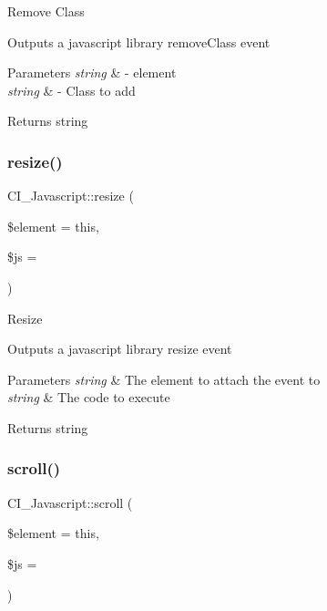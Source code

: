 Remove Class

Outputs a javascript library remove\+Class event


\begin{DoxyParams}{Parameters}
{\em string} & -\/ element \\
\hline
{\em string} & -\/ Class to add \\
\hline
\end{DoxyParams}
\begin{DoxyReturn}{Returns}
string 
\end{DoxyReturn}
\mbox{\label{class_c_i___javascript_adad742ea208e54b0266b221965f27989}} 
\subsubsection{\texorpdfstring{resize()}{resize()}}
{\footnotesize\ttfamily C\+I\+\_\+\+Javascript\+::resize (\begin{DoxyParamCaption}\item[{}]{\$element = {\ttfamily \textquotesingle{}this\textquotesingle{}},  }\item[{}]{\$js = {\ttfamily \textquotesingle{}\textquotesingle{}} }\end{DoxyParamCaption})}

Resize

Outputs a javascript library resize event


\begin{DoxyParams}{Parameters}
{\em string} & The element to attach the event to \\
\hline
{\em string} & The code to execute \\
\hline
\end{DoxyParams}
\begin{DoxyReturn}{Returns}
string 
\end{DoxyReturn}
\mbox{\label{class_c_i___javascript_a0499c5c8ae176041f0e2b62fcced1590}} 
\subsubsection{\texorpdfstring{scroll()}{scroll()}}
{\footnotesize\ttfamily C\+I\+\_\+\+Javascript\+::scroll (\begin{DoxyParamCaption}\item[{}]{\$element = {\ttfamily \textquotesingle{}this\textquotesingle{}},  }\item[{}]{\$js = {\ttfamily \textquotesingle{}\textquotesingle{}} }\end{DoxyParamCaption})}


